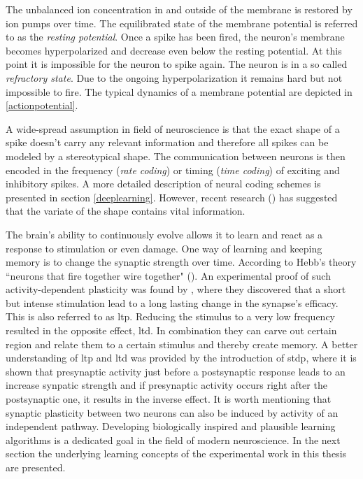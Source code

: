 The unbalanced ion concentration in and outside of the membrane is restored by ion pumps over time. The equilibrated state of the membrane potential is referred to as the \emph{resting potential}. Once a spike has been fired, the neuron's membrane becomes hyperpolarized and decrease even below the resting potential. At this point it is impossible for the neuron to spike again. The neuron is in a so called \emph{refractory state}. Due to the ongoing hyperpolarization it remains hard but not impossible to fire. The typical dynamics of a membrane potential are depicted in \cref{actionpotential}.

A wide-spread assumption in field of neuroscience is that the exact shape of a spike doesn't carry any relevant information and therefore all spikes can be modeled by a stereotypical shape. The communication between neurons is then encoded in the frequency (\emph{rate coding}) or timing (\emph{time coding}) of exciting and inhibitory spikes. A more detailed description of neural coding schemes is presented in section \ref{deeplearning}. However, recent research (\cite{debanne2013mechanisms}) has suggested that the variate of the shape contains vital information.

The brain's ability to continuously evolve allows it to learn and react as a response to stimulation or even damage. One way of learning and keeping memory is to change the synaptic strength over time. According to Hebb's theory ``neurons that fire together wire together" (\cite{hebb1949organization}). An experimental proof of such activity-dependent plasticity was found by \cite{bliss1973long}, where they discovered that a short but intense stimulation lead to a long lasting change in the synapse's efficacy. This is also referred to as \gls{ltp}. Reducing the stimulus to a very low frequency resulted in the opposite effect, \gls{ltd}. In combination they can carve out certain region and relate them to a certain stimulus and thereby create memory. A better understanding of \gls{ltp} and \gls{ltd} was provided by the introduction of \gls{stdp}, where it is shown that presynaptic activity just before a postsynaptic response leads to an increase synpatic strength and if presynaptic activity occurs right after the postsynaptic one, it results in the inverse effect. It is worth mentioning that synaptic plasticity between two neurons can also be induced by activity of an independent pathway. Developing biologically inspired and plausible learning algorithms is a dedicated goal in the field of modern neuroscience. In the next section the underlying learning concepts of the experimental work in this thesis are presented.

